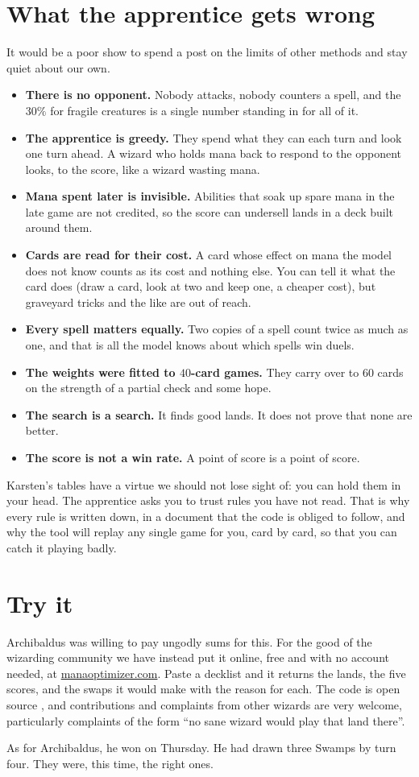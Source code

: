 \documentclass[
    a4paper,
    DIV=13,
    abstract=true,
    numbers=noenddot
]{scrartcl}
\begin{document}
\section{What the apprentice gets wrong}
It would be a poor show to spend a post on the limits of other methods and stay quiet about our own.
\begin{itemize}
  \item \textbf{There is no opponent.} Nobody attacks, nobody counters a spell, and the $30\%$ for fragile creatures is a single number standing in for all of it.
  \item \textbf{The apprentice is greedy.} They spend what they can each turn and look one turn ahead. A wizard who holds mana back to respond to the opponent looks, to the score, like a wizard wasting mana.
  \item \textbf{Mana spent later is invisible.} Abilities that soak up spare mana in the late game are not credited, so the score can undersell lands in a deck built around them.
  \item \textbf{Cards are read for their cost.} A card whose effect on mana the model does not know counts as its cost and nothing else. You can tell it what the card does (draw a card, look at two and keep one, a cheaper cost), but graveyard tricks and the like are out of reach.
  \item \textbf{Every spell matters equally.} Two copies of a spell count twice as much as one, and that is all the model knows about which spells win duels.
  \item \textbf{The weights were fitted to $40$-card games.} They carry over to $60$ cards on the strength of a partial check and some hope.
  \item \textbf{The search is a search.} It finds good lands. It does not prove that none are better.
  \item \textbf{The score is not a win rate.} A point of score is a point of score.
\end{itemize}
Karsten's tables have a virtue we should not lose sight of: you can hold them in your head. The apprentice asks you to trust rules you have not read. That is why every rule is written down, in a document that the code is obliged to follow, and why the tool will replay any single game for you, card by card, so that you can catch it playing badly.

\section{Try it}
Archibaldus was willing to pay ungodly sums for this. For the good of the wizarding community we have instead put it online, free and with no account needed, at \href{https://manaoptimizer.com}{manaoptimizer.com}. Paste a decklist and it returns the lands, the five scores, and the swaps it would make with the reason for each. The code is open source \cite{manaoptimizer}, and contributions and complaints from other wizards are very welcome, particularly complaints of the form ``no sane wizard would play that land there''.

As for Archibaldus, he won on Thursday. He had drawn three Swamps by turn four. They were, this time, the right ones.


\end{document}
